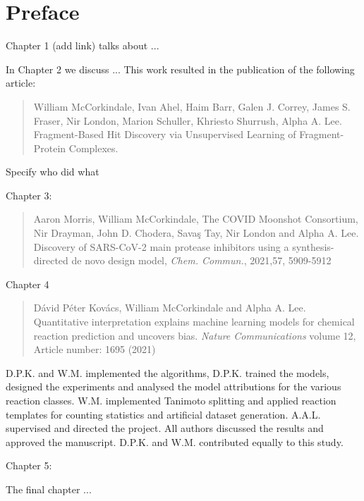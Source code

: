 \chapter*{Preface}
Chapter 1 (add link) talks about ...

In Chapter 2 we discuss ... This work resulted in the publication of the following article:
\begin{quote}
William McCorkindale, Ivan Ahel, Haim Barr, Galen J. Correy, James S. Fraser, Nir London, Marion Schuller, Khriesto Shurrush, Alpha A. Lee. Fragment-Based Hit Discovery via Unsupervised Learning of Fragment-Protein Complexes.
\end{quote}
Specify who did what

Chapter 3:
\begin{quote}
Aaron Morris, William McCorkindale, The COVID Moonshot Consortium, Nir Drayman, John D. Chodera, Savaş Tay, Nir London and Alpha A. Lee. Discovery of SARS-CoV-2 main protease inhibitors using a synthesis-directed de novo design model, \textit{Chem. Commun.}, 2021,57, 5909-5912 
\end{quote}

Chapter 4
\begin{quote}
Dávid Péter Kovács, William McCorkindale and Alpha A. Lee. Quantitative interpretation explains machine learning models for chemical reaction prediction and uncovers bias. \textit{Nature Communications} volume 12, Article number: 1695 (2021)
\end{quote}

D.P.K. and W.M. implemented the algorithms, D.P.K. trained the models, designed the experiments and analysed the model attributions for the various reaction classes. W.M. implemented Tanimoto splitting and applied reaction templates for counting statistics and artificial dataset generation. A.A.L. supervised and directed the project. All authors discussed the results and approved the manuscript. D.P.K. and W.M. contributed equally to this study.

Chapter 5:

The final chapter ...

